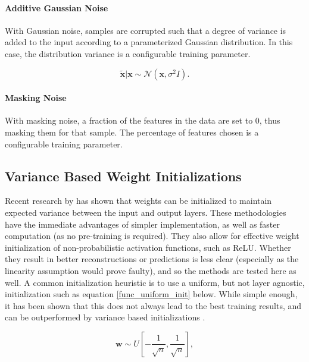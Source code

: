 \documentclass[a4paper,11pt,oneside]{article}
\theoremstyle{plain}
\theoremstyle{definition}
\begin{document}
	\paragraph{Additive Gaussian Noise}
	
	With Gaussian noise, samples are corrupted such that a degree of variance is added to the input according to a parameterized Gaussian distribution. In this case, the distribution variance is a configurable training parameter.
	
	\begin{equation}
	\mathbf{\tilde{{x}}} | \mathbf{x} \sim \mathcal{N}\left(\mathbf{x}, \sigma^{2} I\right) .
	\end{equation}
	
	\paragraph{Masking Noise}
	
	With masking noise, a fraction of the features in the data are set to 0, thus masking them for that sample. The percentage of features chosen is a configurable training parameter.
	
	\subsection{Variance Based Weight Initializations}\label{imp_weights}
	
	Recent research by \citet{He} has shown that weights can be initialized to maintain expected variance between the input and output layers. These methodologies have the immediate advantages of simpler implementation, as well as faster computation (as no pre-training is required). They also allow for effective weight initialization of non-probabilistic activation functions, such as ReLU. Whether they result in better reconstructions or predictions is less clear (especially as the linearity assumption would prove faulty), and so the methods are tested here as well. 
	\newline\newline
	A common initialization heuristic is to use a uniform, but not layer agnostic, initialization such as equation \eqref{func_uniform_init} below. While simple enough, it has been shown that this does not always lead to the best training results, and can be outperformed by variance based initializations \citep{Glorot}.
	
	\begin{equation}\label{func_uniform_init}
	\mathbf{w} \sim U\left[-\frac{1}{\sqrt{n}}, \frac{1}{\sqrt{n}}\right] ,
	\end{equation}
	
\end{document}
